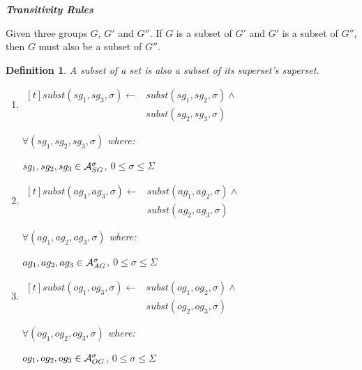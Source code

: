 \documentclass[10pt, twocolumn]{article}
\newtheorem{definition}{Definition}
\begin{document}
        \noindent \textbf{\emph{Transitivity Rules}}

          Given three groups $G$, $G'$ and $G''$. If $G$ is a subset of $G'$
          and $G'$ is a subset of $G''$, then $G$ must also be a subset of
          $G''$.

          \begin{definition}
            A subset of a set is also a subset of its superset's superset.

            \begin{enumerate}
              \item
                \begin{math}
                  \begin{aligned}[t]
                    subst(sg_{1}, sg_{3}, \sigma) \leftarrow &
                    subst(sg_{1}, sg_{2}, \sigma) \land \\
                    & subst(sg_{2}, sg_{3}, \sigma)
                  \end{aligned}
                \end{math}

                $\forall (sg_{1}, sg_{2}, sg_{3}, \sigma)$ where:

                $sg_{1}, sg_{2}, sg_{3} \in {\cal A}^{\sigma}_{SG}$,
                $0 \leq \sigma \leq \Sigma$
              \item
                \begin{math}
                  \begin{aligned}[t]
                    subst(ag_{1}, ag_{3}, \sigma) \leftarrow &
                    subst(ag_{1}, ag_{2}, \sigma) \land \\
                    & subst(ag_{2}, ag_{3}, \sigma)
                  \end{aligned}
                \end{math}

                $\forall (ag_{1}, ag_{2}, ag_{3}, \sigma)$ where:

                $ag_{1}, ag_{2}, ag_{3} \in {\cal A}^{\sigma}_{AG}$,
                $0 \leq \sigma \leq \Sigma$
              \item
                \begin{math}
                  \begin{aligned}[t]
                    subst(og_{1}, og_{3}, \sigma) \leftarrow &
                    subst(og_{1}, og_{2}, \sigma) \land \\
                    & subst(og_{2}, og_{3}, \sigma)
                  \end{aligned}
                \end{math}

                $\forall (og_{1}, og_{2}, og_{3}, \sigma)$ where:

                $og_{1}, og_{2}, og_{3} \in {\cal A}^{\sigma}_{OG}$,
                $0 \leq \sigma \leq \Sigma$

            \end{enumerate}
          \end{definition}
\end{document}
